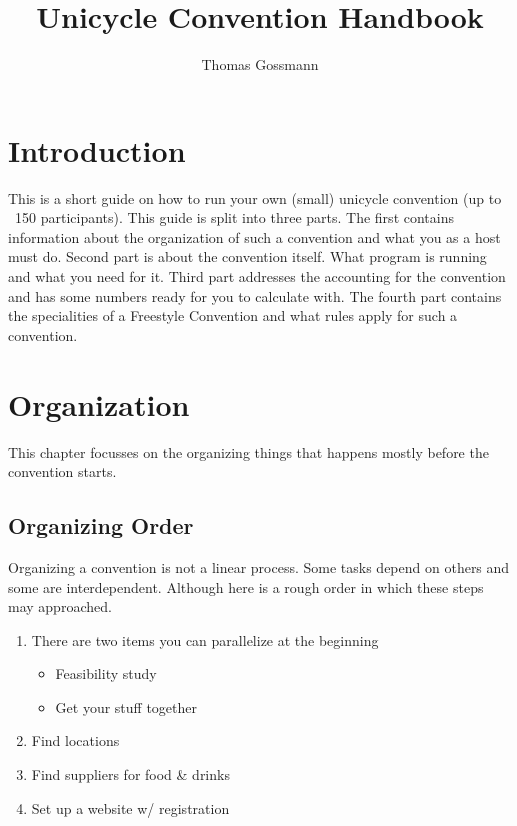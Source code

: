 \documentclass[11pt]{report}
\title{Unicycle Convention Handbook}
\author{Thomas Gossmann}
\date{}
\begin{document}
\maketitle
\tableofcontents

\chapter{Introduction}

This is a short guide on how to run your own (small) unicycle convention (up to 
~150 participants). This guide is split into three parts. The first contains 
information about the organization of such a convention and what you as a host 
must do. Second part is about the convention itself. What program is running and 
what you need for it. Third part addresses the accounting for the convention and 
has some numbers ready for you to calculate with. The fourth part contains the 
specialities of a Freestyle Convention and what rules apply for such a 
convention.

\chapter{Organization}

This chapter focusses on the organizing things that happens mostly before the 
convention starts.

\section{Organizing Order}

Organizing a convention is not a linear process. Some tasks depend on others and 
some are interdependent. Although here is a rough order in which these steps may 
approached.

\begin{enumerate}
	\item There are two items you can parallelize at the beginning
		\begin{itemize}
			\item Feasibility study
			\item Get your stuff together
		\end{itemize}
	\item Find locations
	\item Find suppliers for food & drinks
	\item Set up a website w/ registration
\end{enumerate}
\end{document}
